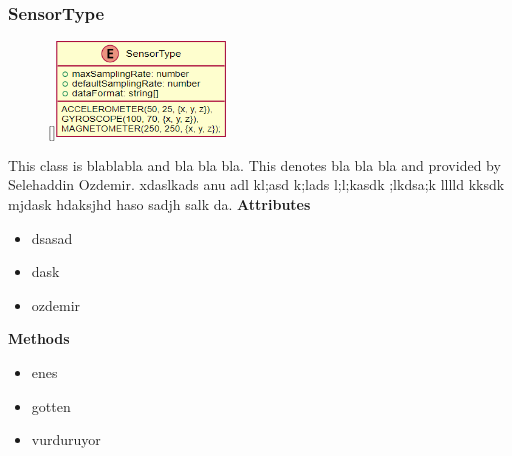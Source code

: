 \subsubsection{SensorType}
\begin{figure}
    \raisebox{0pt}[\dimexpr{}\baselineskip\relax]{\includegraphics[width=4.5cm]{classes/workspace-management/4.png}}
\end{figure} 
\par
This class is blablabla and bla bla bla. This denotes bla bla bla and provided by Selehaddin Ozdemir. xdaslkads anu adl kl;asd k;lads l;l;kasdk ;lkdsa;k lllld kksdk mjdask hdaksjhd haso sadjh salk da.
\newline
\newline
\textbf{Attributes}
\begin{itemize}
    \item dsasad
    \item dask
    \item ozdemir
\end{itemize}
\textbf{Methods}
\begin{itemize}
    \item enes
    \item gotten
    \item vurduruyor
\end{itemize}

